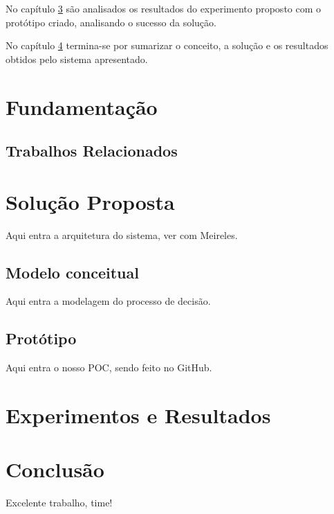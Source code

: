 \documentclass[pfc]{imetex}
\begin{document}
No capítulo \ref{experimentos} são analisados os resultados do experimento proposto com o protótipo criado, analisando o sucesso da solução.

No capítulo \ref{conclusao} termina-se por sumarizar o conceito, a solução e os resultados obtidos pelo sistema apresentado.

\chapter{Fundamentação}
\label{fundamentaca}


\section{Trabalhos Relacionados}
\label{relacionados}


\chapter{Solução Proposta}
\label{solucao}
Aqui entra a arquitetura do sistema, ver com Meireles.\
\begin{center}
    \noindent{}
\end{center}

\section{Modelo conceitual}
\label{modelo}
Aqui entra a modelagem do processo de decisão.

\section{Protótipo}
\label{prototipo}
Aqui entra o nosso POC, sendo feito no GitHub.

\chapter{Experimentos e Resultados}
\label{experimentos}

\chapter{Conclusão}
\label{conclusao}

Excelente trabalho, time!
\end{document}
